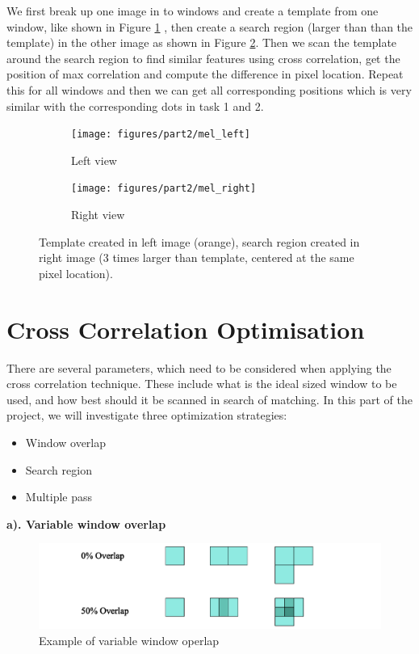 We first break up one image in to windows and create a template from one window, like shown in Figure \ref{fig:mel_left} , then create a search region (larger than than the template) in the other image as shown in Figure \ref{fig:mel_right}. Then we scan the template around the search region to find similar features using cross correlation,
get the position of max correlation and compute the difference in pixel location. Repeat this for all windows and then we can get all corresponding positions which is very similar with the corresponding dots in task 1 and 2.

\begin{figure}[h!]
	\centering
	\begin{subfigure}[t]{0.48\linewidth}
		\centering
		\texttt{[image: figures/part2/mel\_left]}
		\caption{Left view}
		\label{fig:mel_left}
	\end{subfigure}
	\begin{subfigure}[t]{0.48\linewidth}
		\centering
		\texttt{[image: figures/part2/mel\_right]}
		\caption{Right view}
		\label{fig:mel_right}
	\end{subfigure}
	\caption{Template created in left image (orange), search region created in right image (3 times larger than template, centered at the same pixel location).}
	\label{fig:mel}
\end{figure}


\section{Cross Correlation Optimisation}

There are several parameters, which need to be considered when applying the cross correlation technique. These include what is the ideal sized window to be used, and how best should it be scanned in search of matching. In this part of the project, we will investigate three optimization strategies:

\begin{itemize}
	\item Window overlap
	\item Search region
	\item Multiple pass
\end{itemize}

\textbf{a). Variable window overlap}
\begin{figure}[h!]
	\centering
	\includegraphics[width=1\linewidth]{figures/part2/window_overlap}
	\caption{Example of variable window operlap}
	\label{fig:window_overlap}
\end{figure}

